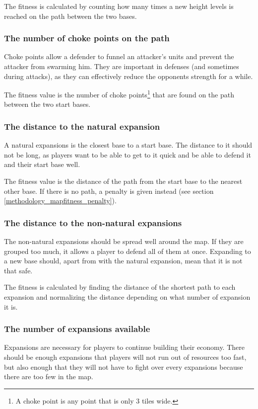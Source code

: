 	The fitness is calculated by counting how many times a new height levels is reached on the path between the two bases.

	\subsubsection*{The number of choke points on the path}
	Choke points allow a defender to funnel an attacker's units and prevent the attacker from swarming him. They are important in defenses (and sometimes during attacks), as they can effectively reduce the opponents strength for a while. 

	The fitness value is the number of choke points\footnote{A choke point is any point that is only 3 tiles wide.} that are found on the path between the two start bases.

	\subsubsection*{The distance to the natural expansion}
	A natural expansions is the closest base to a start base. The distance to it should not be long, as players want to be able to get to it quick and be able to defend it and their start base well. 

	The fitness value is the distance of the path from the start base to the nearest other base. If there is no path, a penalty is given instead (see section \ref{methodology_mapfitness_penalty}).

	\subsubsection*{The distance to the non-natural expansions}
	The non-natural expansions should be spread well around the map. If they are grouped too much, it allows a player to defend all of them at once. Expanding to a new base should, apart from with the natural expansion, mean that it is not that safe. 

	The fitness is calculated by finding the distance of the shortest path to each expansion and normalizing the distance depending on what number of expansion it is.

	\subsubsection*{The number of expansions available}
	Expansions are necessary for players to continue building their economy. There should be enough expansions that players will not run out of resources too fast, but also enough that they will not have to fight over every expansions because there are too few in the map. 


